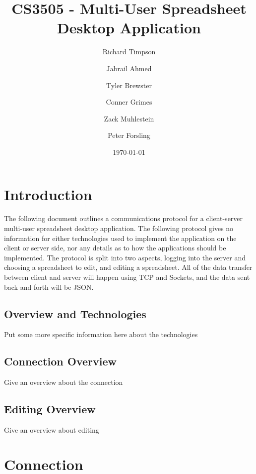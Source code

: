 \documentclass[titlepage]{article}
\title{CS3505 - Multi-User Spreadsheet Desktop Application}
\author{Richard Timpson \and
        Jabrail Ahmed \and 
        Tyler Brewster \and 
        Conner Grimes \and 
        Zack Muhlestein \and 
        Peter Forsling }
\date{\today}
\begin{document}
\maketitle

\tableofcontents

\section{Introduction}
The following document outlines a communications protocol for a client-server 
multi-user spreadsheet desktop application. The following protocol gives no 
information for either technologies used to implement the application on the 
client or server side, nor any details as to how the applications should be 
implemented. The protocol is split into two aspects, logging into the server 
and choosing a spreadsheet to edit, and editing a spreadsheet. All of the data 
transfer between client and server will happen using TCP and Sockets, and the 
data sent back and forth will be JSON.
    \subsection{Overview and Technologies}
    Put some more specific information here about the technologies 
    \subsection{Connection Overview}
    Give an overview about the connection 
    \subsection{Editing Overview}
    Give an overview about editing 
\section{Connection}
\end{document}
